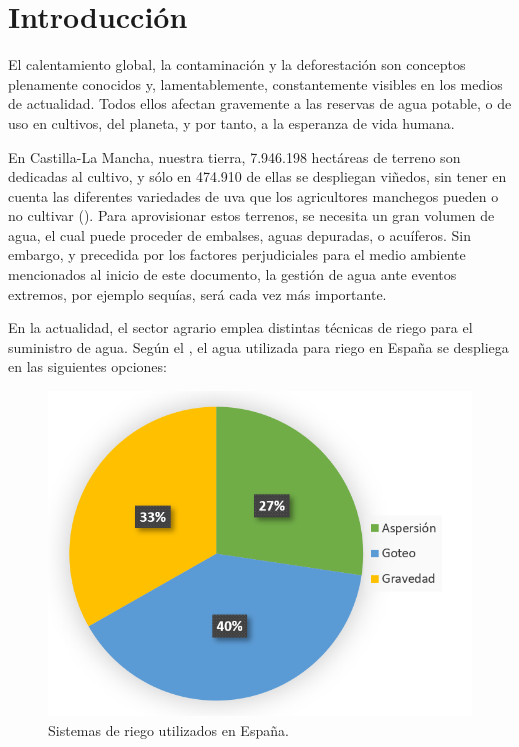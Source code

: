 
\newpage
\section{Introducción}
\label{sec:Introduction}

\justifying \setlength{\parindent}{1.27cm}
\normalsize\mdseries

El calentamiento global, la contaminación y la deforestación son conceptos plenamente conocidos y, lamentablemente, constantemente visibles en los medios de actualidad. Todos ellos afectan gravemente a las reservas de agua potable, o de uso en cultivos, del planeta, y por tanto, a la esperanza de vida humana.\newline

En Castilla-La Mancha, nuestra tierra, 7.946.198 hectáreas de terreno son dedicadas al cultivo, y sólo en 474.910 de ellas se despliegan viñedos, sin tener en cuenta las diferentes variedades de uva que los agricultores manchegos pueden o no cultivar (\cite{gob.miapa.01}). Para aprovisionar estos terrenos, se necesita un gran volumen de agua, el cual puede proceder de embalses, aguas depuradas, o acuíferos. Sin embargo, y precedida por los factores perjudiciales para el medio ambiente mencionados al inicio de este documento, la gestión de agua ante eventos extremos, por ejemplo sequías, será cada vez más importante.\newline

En la actualidad, el sector agrario emplea distintas técnicas de riego para el suministro de agua. Según el \cite{ine.01}, el agua utilizada para riego en España se despliega en las siguientes opciones:

\begin{figure}[h]
    \centering
    \includegraphics[scale=0.75]{figures/graphics/riego_graphic.png}
    \caption{Sistemas de riego utilizados en España.}
    \label{fig:riego_graphic}
\end{figure}

